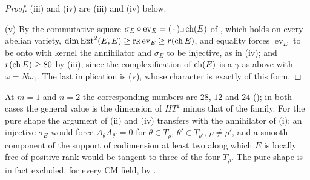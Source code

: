 \begin{proof}
(iii) and (iv) are (iii) and (iv) below.

(v) By the commutative square $\sigma_{E}\circ\operatorname{ev}_{E}=(\,\cdot\,)
\lrcorner\operatorname{ch}(E)$ of , which holds on every abelian
variety, $\dim\operatorname{Ext}^{2}(E,E)\ge\operatorname{rk}\operatorname{ev}_{E}\ge
r(\operatorname{ch} E)$, and equality forces $\operatorname{ev}_{E}$ to be onto with kernel
the annihilator and $\sigma_{E}$ to be injective, as in
(iv); and $r(\operatorname{ch} E)\ge80$ by (iii), since the
complexification of $\operatorname{ch}(E)$ is a $\gamma$ as above with $\omega=N\omega_{1}$.
The last implication is (v), whose character is
exactly of this form.
\end{proof}

At $m=1$ and $n=2$ the corresponding numbers are $28$, $12$ and $24$
(); in both cases the general value is the dimension
of $HT^{2}$ minus that of the family. For the pure shape the argument of
(ii) and (iv) transfers with the annihilator of
(i): an injective $\sigma_{E}$ would force
$A_{\theta}A_{\theta'}=0$ for $\theta\in T_{\rho}$, $\theta'\in T_{\rho'}$,
$\rho\ne\rho'$, and a smooth component of the support of codimension at least
two along which $E$ is locally free of positive rank would be tangent to three
of the four $T_{\rho}$. The pure shape is in fact excluded, for every CM
field, by .

